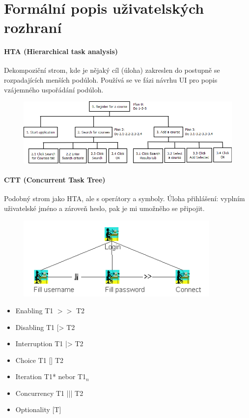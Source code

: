 \section[NUR - Formální popis uživatelských rozhraní]{Formální popis uživatelských rozhraní}

\paragraph{HTA (Hierarchical task analysis)} Dekompoziční strom, kde je nějaký cíl (úloha) zakreslen do postupně se rozpadajících menších podúloh. Používá se ve fázi návrhu UI pro popis vzájemného uspořádání podúloh.

\begin{figure}[h!]
\centering
\includegraphics[width=130mm]{05/images/hta}
\end{figure}

\paragraph{CTT (Concurrent Task Tree)} Podobný strom jako HTA, ale s operátory a symboly. Úloha přihlášení: vyplním uživatelské jméno a zároveň heslo, pak je mi umožněho se připojit.

\begin{figure}[h!]
\centering
\includegraphics[width=100mm]{05/images/ctt}
\end{figure}
\vspace{-15px}
\begin{itemize}[itemsep=0px]
\item Enabling T1 $>>$ T2
\item Disabling T1 [> T2
\item Interruption T1 |> T2
\item Choice T1 [] T2
\item Iteration T1* nebor T1$_{n}$
\item Concurrency T1 ||| T2
\item Optionality [T]
\end{itemize}


